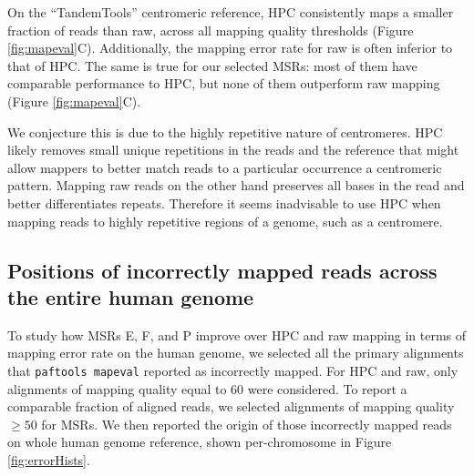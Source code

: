 \documentclass[
  11pt,
  twoside]{scrbook}
\begin{document}
On the ``TandemTools'' centromeric reference, HPC consistently maps a smaller fraction of reads than raw, across all mapping quality thresholds (Figure \ref{fig:mapeval}C). Additionally, the mapping error rate for raw is often inferior to that of HPC. The same is true for our selected MSRs: most of them have comparable performance to HPC, but none of them outperform raw mapping (Figure \ref{fig:mapeval}C).

We conjecture this is due to the highly repetitive nature of centromeres. HPC likely removes small unique repetitions in the reads and the reference that might allow mappers to better match reads to a particular occurrence a centromeric pattern. Mapping raw reads on the other hand preserves all bases in the read and better differentiates repeats. Therefore it seems inadvisable to use HPC when mapping reads to highly repetitive regions of a genome, such as a centromere.

\hypertarget{positions-of-incorrectly-mapped-reads-across-the-entire-human-genome}{%
\subsection{Positions of incorrectly mapped reads across the entire human genome}\label{positions-of-incorrectly-mapped-reads-across-the-entire-human-genome}}

To study how MSRs E, F, and P improve over HPC and raw mapping in terms of mapping error rate on the human genome, we selected all the primary alignments that \texttt{paftools\ mapeval} reported as incorrectly mapped. For HPC and raw, only alignments of mapping quality equal to 60 were considered. To report a comparable fraction of aligned reads, we selected alignments of mapping quality \(\geq50\) for MSRs. We then reported the origin of those incorrectly mapped reads on whole human genome reference, shown per-chromosome in Figure \ref{fig:errorHists}.
\end{document}

